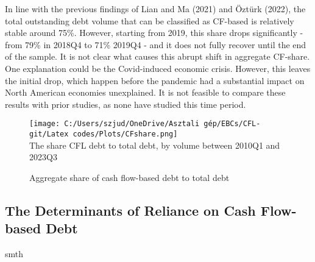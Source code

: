 \documentclass[12pt]{article}
\begin{document}
\noindent In line with the previous findings of Lian and Ma (2021) and Öztürk (2022), the total outstanding debt volume that can be classified as CF-based is relatively stable around 75\%. However, starting from 2019, this share drops significantly - from 79\% in 2018Q4 to 71\% 2019Q4 - and it does not fully recover until the end of the sample. It is not clear what causes this abrupt shift in aggregate CF-share. One explanation could be the Covid-induced economic crisis. However, this leaves the initial drop, which happen before the pandemic had a substantial impact on North American economies unexplained. It is not feasible to compare these results with prior studies, as none have studied this time period.

\begin{figure}[H]  %
    \centering
    \caption{Aggregate share of cash flow-based debt to total debt} \label{chart:CFLshare}
    \texttt{[image: C:/Users/szjud/OneDrive/Asztali gép/EBCs/CFL-git/Latex codes/Plots/CFshare.png]} \\
     \small The share CFL debt to total debt, by volume between 2010Q1 and 2023Q3
\end{figure}
\subsection{The Determinants of Reliance on Cash Flow-based Debt \label{sec:CFshare}}
smth
\end{document}
